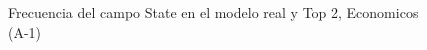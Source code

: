 \begin{figure}[H]
    \centering
    
    \caption{Frecuencia del campo State en el modelo real y Top 2, Economicos (A-1)}
    \label{frecuency-State-top2}
\end{figure}